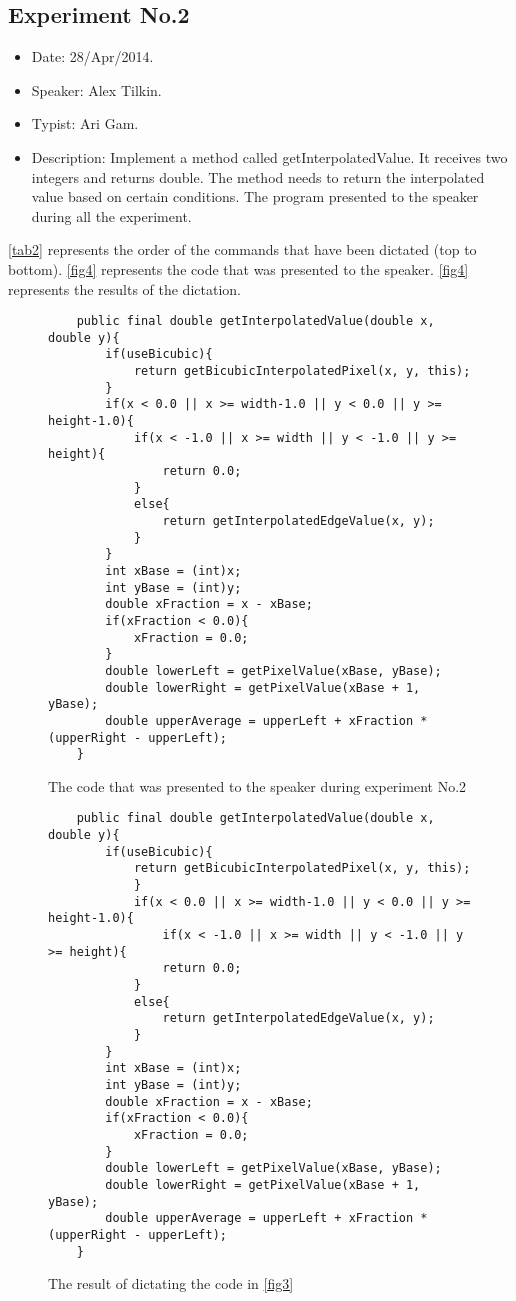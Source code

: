 \subsection{Experiment No.2}
\begin{itemize}
	\item Date: 28/Apr/2014.
	\item Speaker: Alex Tilkin.
	\item Typist: Ari Gam.
	\item Description: Implement a method called getInterpolatedValue. It receives two integers and returns double. The method needs to return the interpolated value based on certain conditions. The program presented to the speaker during all the experiment.
\end{itemize}
\autoref{tab2} represents the order of the commands that have been dictated (top to bottom). \autoref{fig4} represents the code that was presented to the speaker. \autoref{fig4} represents the results of the dictation.
\begin{figure}[H]
	\begin{lstlisting}
	public final double getInterpolatedValue(double x, double y){
		if(useBicubic){
			return getBicubicInterpolatedPixel(x, y, this);
		}
		if(x < 0.0 || x >= width-1.0 || y < 0.0 || y >= height-1.0){
			if(x < -1.0 || x >= width || y < -1.0 || y >= height){
				return 0.0;
			}
			else{
				return getInterpolatedEdgeValue(x, y);
			}
		}
		int xBase = (int)x;
		int yBase = (int)y;
		double xFraction = x - xBase;
		if(xFraction < 0.0){
			xFraction = 0.0;
		}
		double lowerLeft = getPixelValue(xBase, yBase);
		double lowerRight = getPixelValue(xBase + 1, yBase);
		double upperAverage = upperLeft + xFraction * (upperRight - upperLeft);
	}
	\end{lstlisting}
	\caption{The code that was presented to the speaker during experiment No.2}
	\label{fig4}
\end{figure}
\begin{figure}[H]
	\begin{lstlisting}
	public final double getInterpolatedValue(double x, double y){
		if(useBicubic){
			return getBicubicInterpolatedPixel(x, y, this);
			}
			if(x < 0.0 || x >= width-1.0 || y < 0.0 || y >= height-1.0){
				if(x < -1.0 || x >= width || y < -1.0 || y >= height){
				return 0.0;
			}
			else{
				return getInterpolatedEdgeValue(x, y);
			}
		}
		int xBase = (int)x;
		int yBase = (int)y;
		double xFraction = x - xBase;
		if(xFraction < 0.0){
			xFraction = 0.0;
		}
		double lowerLeft = getPixelValue(xBase, yBase);
		double lowerRight = getPixelValue(xBase + 1, yBase);
		double upperAverage = upperLeft + xFraction * (upperRight - upperLeft);
	}
	\end{lstlisting}
	\caption{The result of dictating the code in \autoref{fig3}}
	\label{fig4}
\end{figure}
